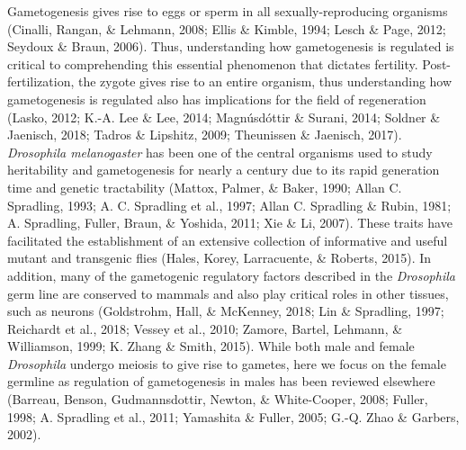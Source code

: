 \documentclass[12pt,oneside]{reedthesis}
\begin{document}
Gametogenesis gives rise to eggs or sperm in all sexually-reproducing
organisms (Cinalli, Rangan, \& Lehmann, 2008; Ellis \& Kimble, 1994; Lesch \& Page, 2012; Seydoux \& Braun, 2006).
Thus, understanding how gametogenesis is regulated is critical to
comprehending this essential phenomenon that dictates fertility.
Post-fertilization, the zygote gives rise to an entire organism, thus
understanding how gametogenesis is regulated also has implications for
the field of regeneration (Lasko, 2012; K.-A. Lee \& Lee, 2014; Magnúsdóttir \& Surani, 2014; Soldner \& Jaenisch, 2018; Tadros \& Lipshitz, 2009; Theunissen \& Jaenisch, 2017).
\emph{Drosophila melanogaster} has been one of the central organisms used to
study heritability and gametogenesis for nearly a century due to its
rapid generation time and genetic tractability (Mattox, Palmer, \& Baker, 1990; Allan C. Spradling, 1993; A. C. Spradling et al., 1997; Allan C. Spradling \& Rubin, 1981; A. Spradling, Fuller, Braun, \& Yoshida, 2011; Xie \& Li, 2007). These traits have facilitated the establishment of an
extensive collection of informative and useful mutant and transgenic
flies (Hales, Korey, Larracuente, \& Roberts, 2015). In addition, many of the gametogenic regulatory
factors described in the \emph{Drosophila} germ line are conserved to mammals
and also play critical roles in other tissues, such as neurons
(Goldstrohm, Hall, \& McKenney, 2018; Lin \& Spradling, 1997; Reichardt et al., 2018; Vessey et al., 2010; Zamore, Bartel, Lehmann, \& Williamson, 1999; K. Zhang \& Smith, 2015). While both male and female \emph{Drosophila}
undergo meiosis to give rise to gametes, here we focus on the female
germline as regulation of gametogenesis in males has been reviewed
elsewhere (Barreau, Benson, Gudmannsdottir, Newton, \& White-Cooper, 2008; Fuller, 1998; A. Spradling et al., 2011; Yamashita \& Fuller, 2005; G.-Q. Zhao \& Garbers, 2002).
\end{document}

